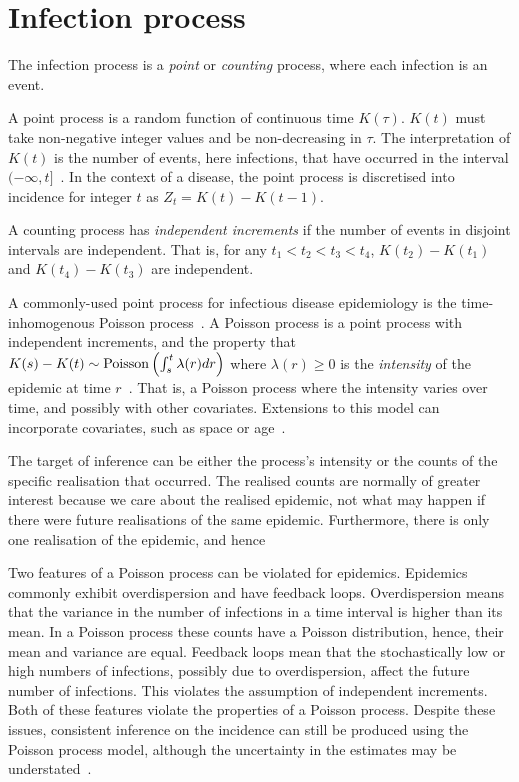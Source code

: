\documentclass[thesis.tex]{subfiles}
\begin{document}
\section{Infection process} \label{inc-prev:sec:infection-process}
The infection process is a \emph{point} or \emph{counting} process, where each infection is an event.

A point process is a random function of continuous time $K(\tau)$.
$K(t)$ must take non-negative integer values and be non-decreasing in $\tau$.
The interpretation of $K(t)$ is the number of events, here infections, that have occurred in the interval $(-\infty, t]$~\autocites[244]{yanDistribution}.
In the context of a disease, the point process is discretised into incidence for integer $t$ as $Z_t = K(t) - K(t-1)$.

A counting process has \emph{independent increments} if the number of events in disjoint intervals are independent.
That is, for any $t_1 < t_2 < t_3 < t_4$, $K(t_2) - K(t_1)$ and $K(t_4) - K(t_3)$ are independent.

A commonly-used point process for infectious disease epidemiology is the time-inhomogenous Poisson process~\autocites{brookmeyerMethod}{paganoHIV}{rosenbergBackcalculation}{brookmeyerBackcalculation}.
A Poisson process is a point process with independent increments, and the property that $K(s) - K(t) \sim \operatorname{Poisson}\left(\int_s^t \lambda(r) dr \right)$ where $\lambda(r) \geq 0$ is the \emph{intensity} of the epidemic at time $r$~\autocites[244]{yanDistribution}.
That is, a Poisson process where the intensity varies over time, and possibly with other covariates.
Extensions to this model can incorporate covariates, such as space or age~\autocite[e.g.][]{diggleModeling}.

The target of inference can be either the process's intensity or the counts of the specific realisation that occurred.
The realised counts are normally of greater interest because we care about the realised epidemic, not what may happen if there were future realisations of the same epidemic.
Furthermore, there is only one realisation of the epidemic, and hence

Two features of a Poisson process can be violated for epidemics.
Epidemics commonly exhibit overdispersion and have feedback loops.
Overdispersion means that the variance in the number of infections in a time interval is higher than its mean.
In a Poisson process these counts have a Poisson distribution, hence, their mean and variance are equal.
Feedback loops mean that the stochastically low or high numbers of infections, possibly due to overdispersion, affect the future number of infections.
This violates the assumption of independent increments.
Both of these features violate the properties of a Poisson process.
Despite these issues, consistent inference on the incidence can still be produced using the Poisson process model, although the uncertainty in the estimates may be understated~\autocite{beckerDependent}.
\end{document}
